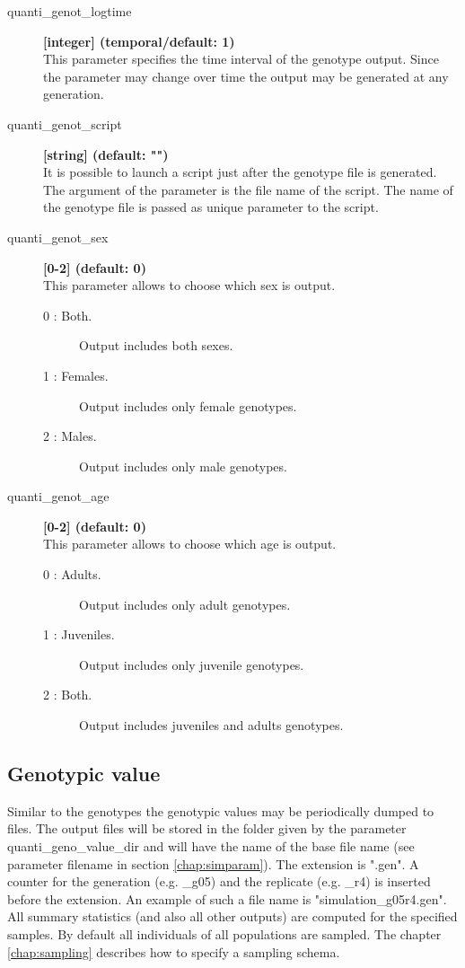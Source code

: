 \documentclass[letterpaper,12pt,oneside]{book}
\begin{document}
\begin{description}
\item[quanti\_genot\_logtime] \textbf{[integer] (temporal/default: 1)}\\
This parameter specifies the time interval of the genotype output. Since the parameter may change over time the output may be generated at any generation.

\item[quanti\_genot\_script] \textbf{[string] (default: "")}\\
It is possible to launch a script just after the genotype file is generated. The argument of the parameter is the file name of the script. The name of the genotype file is passed as unique parameter to the script. 

\item[quanti\_genot\_sex] \textbf{[0-2] (default: 0)}\\
This parameter allows to choose which sex is output. 
\begin{description}
\item [0 : Both.] Output includes both sexes.
\item [1 : Females.] Output includes only female genotypes.
\item [2 : Males.] Output includes only male genotypes.
\end{description}

\item[quanti\_genot\_age] \textbf{[0-2] (default: 0)}\\
This parameter allows to choose which age is output.  
\begin{description}
\item [0 : Adults.] Output includes only adult genotypes.
\item [1 : Juveniles.] Output includes only juvenile genotypes.
\item [2 : Both.] Output includes juveniles and adults genotypes.
\end{description}


\end{description}



\subsection{Genotypic value}\label{genoValQuanti}
Similar to the genotypes the genotypic values may be periodically dumped to files. The output files will be stored in the folder given by the parameter \textsf{quanti\_geno\_value\_dir} and will have the name of the base file name (see parameter \textsf{filename} in section \ref{chap:simparam}). The extension is ".gen". A counter for the generation (e.g. \_g05) and the replicate (e.g. \_r4) is inserted before the extension. An example of such a file name is \textsf{"simulation\_g05r4.gen"}. All summary statistics (and also all other outputs) are computed for the specified samples. By default all individuals of all populations are sampled. The chapter \ref{chap:sampling} describes how to specify a sampling schema.
\end{document}
